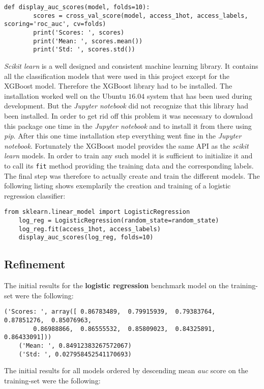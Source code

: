 \documentclass[11pt]{article}
\begin{document}
\begin{lstlisting}[frame=single]
    def display_auc_scores(model, folds=10):
        scores = cross_val_score(model, access_1hot, access_labels, scoring='roc_auc', cv=folds)
        print('Scores: ', scores)
        print('Mean: ', scores.mean())
        print('Std: ', scores.std())
\end{lstlisting}
\noindent
{\it Scikit learn} is a well designed and consistent machine learning library.
It contains all the classification models that were used in this project
except for the XGBoost model. Therefore the XGBoost library had to be installed.
The installation worked well on the Ubuntu $16.04$ system that has been used 
during development. But the {\it Jupyter notebook} did not recognize that this
library had been installed. In order to get rid off this problem 
it was necessary to download this package one time in the {\it Jupyter notebook}
and to install it from there using {\it pip}. After this one time installation step
everything went fine in the {\it Jupyter notebook}. 
Fortunately the XGBoost model provides the same API as the {\it scikit learn} models.
In order to train any such model it is sufficient to initialize it and to call
its {\tt fit} method providing the training data and the corresponding labels. 
The final step was therefore to actually create and train the different models. 
The following listing shows exemplarily the creation and training 
of a logistic regression classifier:

\begin{lstlisting}[frame=single]
    from sklearn.linear_model import LogisticRegression
    log_reg = LogisticRegression(random_state=random_state)
    log_reg.fit(access_1hot, access_labels)
    display_auc_scores(log_reg, folds=10)
\end{lstlisting}

\subsection{Refinement}
The initial results for the {\bf logistic regression} benchmark model on the training-set
were the following:
\begin{lstlisting}[frame=single]
    ('Scores: ', array([ 0.86783489,  0.79915939,  0.79383764,  0.87851276,  0.85076963,
        0.86988866,  0.86555532,  0.85809023,  0.84325891,  0.86433091]))
    ('Mean: ', 0.84912383267572067)
    ('Std: ', 0.027958452541170693)
\end{lstlisting}
\noindent
The initial results for all models ordered by descending mean {\it auc} score 
on the training-set were the following:
\end{document}
